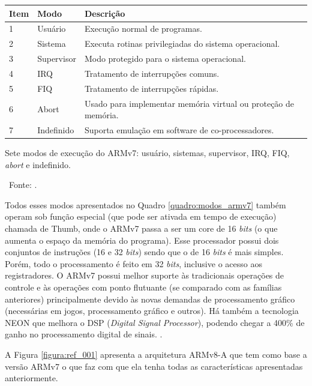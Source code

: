\begin{quadro}[htb] \centering
	\begin{tabular}{lll}        \hline
		\textbf{Item}    & \textbf{Modo}           & \textbf{Descrição}                                             \\ \hline \hline
		1       & Usuário        & Execução normal de programas.                                   \\ 
		2       & Sistema        & Executa rotinas privilegiadas do sistema operacional.           \\ 
		3       & Supervisor     & Modo protegido para o sistema operacional.                      \\ 
		4       & IRQ            & Tratamento de interrupções comuns.                              \\ 
		5       & FIQ            & Tratamento de interrupções rápidas.                             \\ 
		6       & Abort          & Usado para implementar memória virtual ou proteção de memória.  \\ 
		7       & Indefinido     & Suporta emulação em software de co-processadores.      \\ \hline
	\end{tabular}
	\caption{Sete modos de execução do ARMv7: usuário, sistemas, supervisor, IRQ, FIQ, \textit{abort} e indefinido.}
	\ Fonte: \cite{cruz:2013:desenvolvimento}.
	\label{quadro:modos_armv7}
\end{quadro}

Todos esses modos apresentados no Quadro \ref{quadro:modos_armv7} também operam sob função especial (que pode ser ativada em tempo de execução) chamada de Thumb, onde o ARMv7 passa a ser um core de 16 \textit{bits} (o que aumenta o espaço da memória do programa). Esse processador possui dois conjuntos de instruções (16 e 32 \textit{bits}) sendo que o de 16 \textit{bits} é mais simples. Porém, todo o processamento é feito em 32 \textit{bits}, inclusive o acesso aos registradores. O ARMv7 possui melhor suporte às tradicionais operações de controle e às operações com ponto flutuante (se comparado com as famílias anteriores) principalmente devido às novas demandas de processamento gráfico (necessárias em jogos, processamento gráfico e outros). Há também a tecnologia NEON que melhora o DSP (\textit{Digital Signal Processor}), podendo chegar a 400\% de ganho no processamento digital de sinais. \cite[p.~17]{cruz:2013:desenvolvimento}.

A Figura \ref{figura:ref_001} apresenta a  arquitetura ARMv8-A que tem como base  a versão ARMv7 o que faz com que ela tenha todas as características apresentadas anteriormente. 

